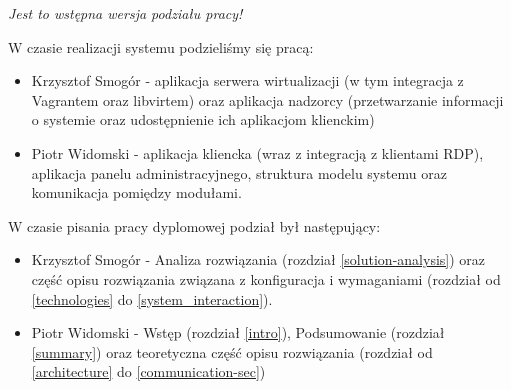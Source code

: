 \documentclass[../wstep.tex]{subfiles}
\begin{document}
\textit{Jest to wstępna wersja podziału pracy!}

W czasie realizacji systemu podzieliśmy się pracą:
\begin{itemize}
    \item Krzysztof Smogór - aplikacja serwera wirtualizacji (w tym integracja z Vagrantem oraz libvirtem) oraz aplikacja nadzorcy (przetwarzanie informacji o systemie oraz udostępnienie ich aplikacjom klienckim)
    \item Piotr Widomski - aplikacja kliencka (wraz z integracją z klientami RDP), aplikacja panelu administracyjnego, struktura modelu systemu oraz komunikacja pomiędzy modułami.
\end{itemize}

W czasie pisania pracy dyplomowej podział był następujący:
\begin{itemize}
    \item Krzysztof Smogór - Analiza rozwiązania (rozdział \ref{solution-analysis}) oraz część opisu rozwiązania związana z konfiguracja i wymaganiami (rozdział od \ref{technologies} do \ref{system_interaction}).
    \item Piotr Widomski - Wstęp (rozdział \ref{intro}), Podsumowanie (rozdział \ref{summary}) oraz teoretyczna część opisu rozwiązania (rozdział od \ref{architecture} do \ref{communication-sec})
\end{itemize}
\end{document}
